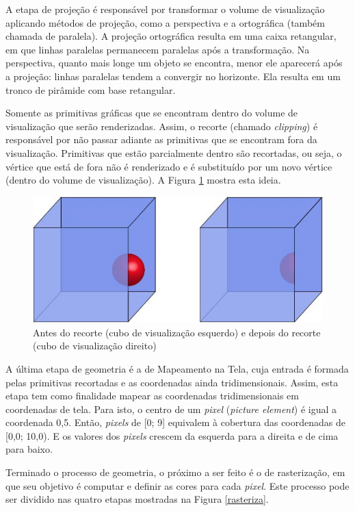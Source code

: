 	A etapa de projeção é responsável por transformar o volume de visualização aplicando métodos de projeção, como a perspectiva e a ortográfica (também chamada de paralela). A projeção ortográfica resulta em uma caixa retangular, em que linhas paralelas permanecem paralelas após a transformação. Na perspectiva, quanto mais longe um objeto se encontra, menor ele aparecerá após a projeção: linhas paralelas tendem a convergir no horizonte. Ela resulta em um tronco de pirâmide com base retangular. 

	Somente as primitivas gráficas que se encontram dentro do volume de visualização que serão renderizadas. Assim, o recorte (chamado \textit{clipping}) é responsável por não passar adiante as primitivas que se encontram fora da visualização. Primitivas que estão parcialmente dentro são recortadas, ou seja, o vértice que está de fora não é renderizado e é substituído por um novo vértice (dentro do volume de visualização). A  Figura \ref{clip} mostra esta ideia.

       \begin{figure}[h]
       \centering
	\includegraphics[keepaspectratio=true,scale=0.8]{figuras/clip.jpg}
       \caption{Antes do recorte (cubo de visualização esquerdo) e depois do recorte (cubo de visualização direito)}
       \label{clip}
       \end{figure}


	A última etapa de geometria é a de Mapeamento na Tela, cuja entrada é formada pelas primitivas recortadas e as coordenadas ainda tridimensionais. Assim, esta etapa tem como finalidade mapear as coordenadas tridimensionais em coordenadas de tela. Para isto, o centro de um \textit{pixel} (\textit{picture element}) é igual a coordenada 0,5. Então, \textit{pixels} de [0; 9] equivalem à cobertura das coordenadas de [0,0; 10,0). E os valores dos \textit{pixels} crescem da esquerda para a direita e de cima para baixo.

	Terminado o processo de geometria, o próximo a ser feito é o de rasterização, em que seu objetivo é computar e definir as cores para cada \textit{pixel}. Este processo pode ser dividido nas quatro etapas mostradas na Figura \ref{rasteriza}.

